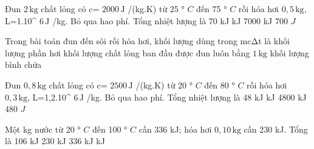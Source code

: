 \begin{ex}
Đun $2\,\text{kg}$ chất lỏng có c= $2000\,\text{J}$ /(kg.K) từ 25 ° $C$ đến 75 ° $C$ rồi hóa hơi $0,5\,\text{kg}$, L=1.10^ $6\,\text{J}$ /kg. Bỏ qua hao phí. Tổng nhiệt lượng là
\choice
{70 kJ}
{ kJ}
{7000 kJ}
{700 $J$}
\end{ex}

\begin{ex}
Trong bài toán đun đến sôi rồi hóa hơi, khối lượng dùng trong mcΔt là
\choice
{khối lượng phần hơi}
{\True khối lượng chất lỏng ban đầu được đun}
{luôn bằng $1\,\text{kg}$}
{khối lượng bình chứa}
\end{ex}

\begin{ex}
Đun $0,8\,\text{kg}$ chất lỏng có c= $2500\,\text{J}$ /(kg.K) từ 20 ° $C$ đến 80 ° $C$ rồi hóa hơi $0,3\,\text{kg}$, L=1,2.10^ $6\,\text{J}$ /kg. Bỏ qua hao phí. Tổng nhiệt lượng là
\choice
{48 kJ}
{ kJ}
{4800 kJ}
{480 $J$}
\end{ex}

\begin{ex}
Một kg nước từ 20 ° $C$ đến 100 ° $C$ cần 336 kJ; hóa hơi $0,10\,\text{kg}$ cần 230 kJ. Tổng là
\choice
{106 kJ}
{230 kJ}
{336 kJ}
{ kJ}
\end{ex}
